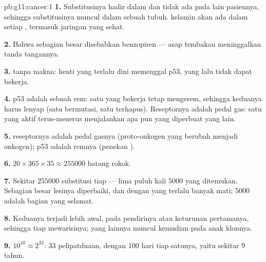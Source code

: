 \begin{solution}{pb:g11:cancer:1}
\textbf{1.} Substitusinya hadir dalam  dan tidak ada pada 
lain pasiennya, sehingga substitusinya muncul dalam sebuah  tubuh.
  kelamin akan ada dalam setiap , termasuk jaringan yang sehat.

\textbf{2.} Bahwa sebagian besar   disebabkan benzopiren
---  asap tembakau meninggalkan tanda tangannya.

\textbf{3.}  tanpa makna:  henti yang terlalu dini
memenggal p53, yang lalu tidak dapat bekerja.

\textbf{4.} p53 adalah sebuah rem: satu  yang bekerja tetap
mengerem, sehingga keduanya harus lenyap (satu bermutasi, satu
terhapus). Reseptornya adalah pedal gas: satu  yang aktif
terus-menerus menjalankan  apa pun yang diperbuat  yang lain.

\textbf{5.}  reseptornya adalah pedal gasnya (proto-onkogen yang
berubah menjadi onkogen); p53 adalah remnya (penekan ).

\textbf{6.} $20 \times 365 \times 35 \approx \num{255000}$ batang rokok.

\textbf{7.} Sekitar $\num{255000}$ substitusi tiap  --- lima puluh
kali 5000 yang ditemukan. Sebagian besar lesinya diperbaiki, dan 
dengan  yang terlalu banyak mati; 5000 adalah bagian yang selamat.

\textbf{8.} Keduanya terjadi lebih awal, pada  pendirinya atau
keturunan pertamanya, sehingga tiap   mewarisinya; yang
lainnya muncul kemudian pada anak klonnya.

\textbf{9.} $10^{10} \approx 2^{33}$: 33 pelipatduaan, dengan 100 hari
tiap satunya, yaitu sekitar 9 tahun.


\end{solution}

